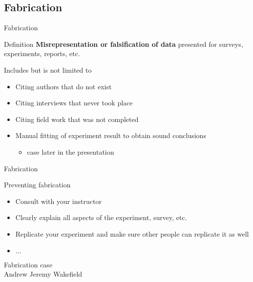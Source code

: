 	\subsection{Fabrication}

		\begin{frame}{Fabrication}
			
			\begin{block}{Definition}
				\textbf{Misrepresentation or falsification of data} presented for surveys, experiments, reports, etc.

				Includes but is not limited to

				\begin{itemize}
					\item
						Citing authors that do not exist
					\item 
						Citing interviews that never took place
					\item
						Citing field work that was not completed
					\item 
						Manual fitting of experiment result to obtain sound conclusions
						\begin{itemize}
							\item 
								case later in the presentation
						\end{itemize}
				\end{itemize}

			\end{block}

		\end{frame}

		\begin{frame}{Fabrication}
			
			Preventing fabrication

			\begin{itemize}
				\item 
					Consult with your instructor
				\item 
					Clearly explain all aspects of the experiment, survey, etc.
				\item 
					Replicate your experiment and make sure other people can replicate it as well
				\item 
					$\ldots$
			\end{itemize}

		\end{frame}

		\begin{frame}[standout]
			
			Fabrication case \\
			Andrew Jeremy Wakefield


		\end{frame}

